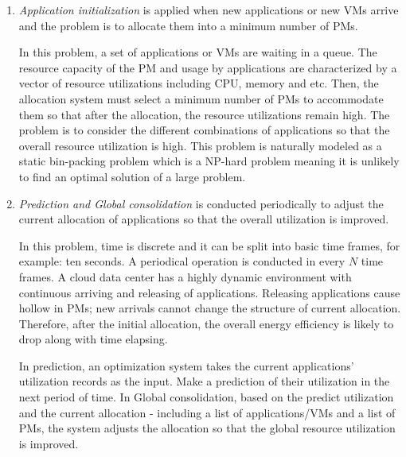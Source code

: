 \begin{enumerate}
	\item \emph{Application initialization} is applied when new applications or new VMs arrive and the problem is to allocate them into a minimum number of PMs.

	In this problem, a set of applications or VMs are waiting in a queue. The resource capacity of the PM and usage by applications are characterized by a vector of resource utilizations including CPU, memory and etc. Then, the allocation system must select a minimum number of PMs to accommodate them so that after the allocation, the resource utilizations remain high. The problem is to consider the different combinations of applications so that the overall resource utilization is high. This problem is naturally modeled as a static bin-packing problem \cite{CoffmanJr:1996ui} which is a NP-hard problem meaning it is unlikely to find an optimal solution of a large problem. 

	\item \emph{Prediction and Global consolidation} is conducted periodically to adjust the current allocation of applications so that the overall utilization is improved.

	In this problem, time is discrete and it can be split into basic time frames, for example: ten seconds. A periodical operation is conducted in every $N$ time frames.
	A cloud data center has a highly dynamic environment with continuous arriving and releasing of applications. Releasing applications cause hollow in PMs; new arrivals cannot change the structure of current allocation. Therefore, after the initial allocation, the overall energy efficiency is likely to drop along with time elapsing. 

	In prediction, an optimization system takes  the current applications' utilization records as the input. Make a prediction of their utilization in the next period of time. 
	In Global consolidation, based on the predict utilization and the current allocation - including a list of applications/VMs and a list of PMs, the system adjusts the allocation so that the global resource utilization is improved.


\end{enumerate}
